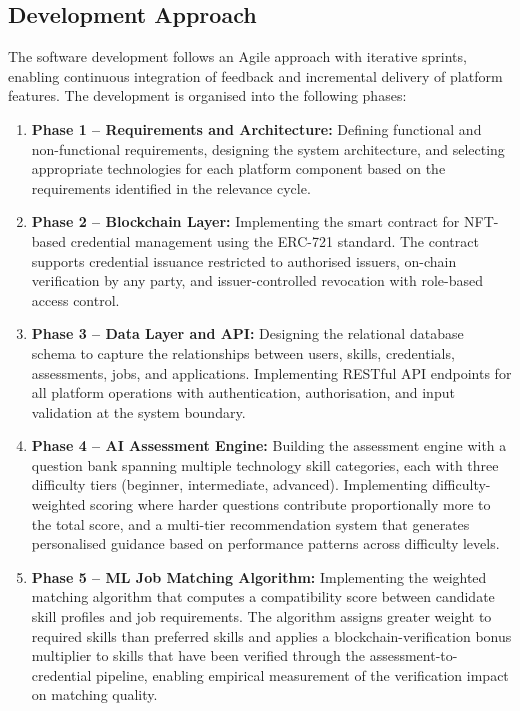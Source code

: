 \subsection{Development Approach}
\label{sec:DevMethodology}

The software development follows an Agile approach with iterative sprints, enabling continuous integration of feedback and incremental delivery of platform features. The development is organised into the following phases:

\begin{enumerate}
    \item \textbf{Phase 1 -- Requirements and Architecture:} Defining functional and non-functional requirements, designing the system architecture, and selecting appropriate technologies for each platform component based on the requirements identified in the relevance cycle.

    \item \textbf{Phase 2 -- Blockchain Layer:} Implementing the smart contract for NFT-based credential management using the ERC-721 standard. The contract supports credential issuance restricted to authorised issuers, on-chain verification by any party, and issuer-controlled revocation with role-based access control.

    \item \textbf{Phase 3 -- Data Layer and API:} Designing the relational database schema to capture the relationships between users, skills, credentials, assessments, jobs, and applications. Implementing RESTful API endpoints for all platform operations with authentication, authorisation, and input validation at the system boundary.

    \item \textbf{Phase 4 -- AI Assessment Engine:} Building the assessment engine with a question bank spanning multiple technology skill categories, each with three difficulty tiers (beginner, intermediate, advanced). Implementing difficulty-weighted scoring where harder questions contribute proportionally more to the total score, and a multi-tier recommendation system that generates personalised guidance based on performance patterns across difficulty levels.

    \item \textbf{Phase 5 -- ML Job Matching Algorithm:} Implementing the weighted matching algorithm that computes a compatibility score between candidate skill profiles and job requirements. The algorithm assigns greater weight to required skills than preferred skills and applies a blockchain-verification bonus multiplier to skills that have been verified through the assessment-to-credential pipeline, enabling empirical measurement of the verification impact on matching quality.


\end{enumerate}

